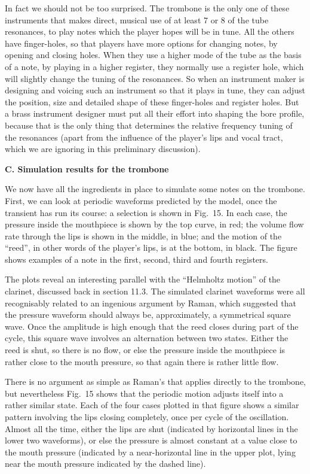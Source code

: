   In fact we should not be too surprised. The trombone is the only one of these 
  instruments that makes direct, musical use of at least 7 or 8 of the tube 
  resonances, to play notes which the player hopes will be in tune. All the 
  others have finger-holes, so that players have more options for changing 
  notes, by opening and closing holes. When they use a higher mode of the tube 
  as the basis of a note, by playing in a higher register, they normally use a 
  register hole, which will slightly change the tuning of the resonances. So 
  when an instrument maker is designing and voicing such an instrument so that 
  it plays in tune, they can adjust the position, size and detailed shape of 
  these finger-holes and register holes. But a brass instrument designer must 
  put all their effort into shaping the bore profile, because that is the only 
  thing that determines the relative frequency tuning of the resonances (apart 
  from the influence of the player's lips and vocal tract, which we are 
  ignoring in this preliminary discussion). 

  \textbf{C. Simulation results for the trombone} 

  We now have all the ingredients in place to simulate some notes on the 
  trombone. First, we can look at periodic waveforms predicted by the model, 
  once the transient has run its course: a selection is shown in Fig.\ 15. In 
  each case, the pressure inside the mouthpiece is shown by the top curve, in 
  red; the volume flow rate through the lips is shown in the middle, in blue; 
  and the motion of the “reed”, in other words of the player’s lips, is at the 
  bottom, in black. The figure shows examples of a note in the first, second, 
  third and fourth registers. 

  The plots reveal an interesting parallel with the ``Helmholtz motion'' of the 
  clarinet, discussed back in section 11.3. The simulated clarinet waveforms 
  were all recognisably related to an ingenious argument by Raman, which 
  suggested that the pressure waveform should always be, approximately, a 
  symmetrical square wave. Once the amplitude is high enough that the reed 
  closes during part of the cycle, this square wave involves an alternation 
  between two states. Either the reed is shut, so there is no flow, or else the 
  pressure inside the mouthpiece is rather close to the mouth pressure, so that 
  again there is rather little flow. 

  There is no argument as simple as Raman’s that applies directly to the 
  trombone, but nevertheless Fig.\ 15 shows that the periodic motion adjusts 
  itself into a rather similar state. Each of the four cases plotted in that 
  figure shows a similar pattern involving the lips closing completely, once 
  per cycle of the oscillation. Almost all the time, either the lips are shut 
  (indicated by horizontal lines in the lower two waveforms), or else the 
  pressure is almost constant at a value close to the mouth pressure (indicated 
  by a near-horizontal line in the upper plot, lying near the mouth pressure 
  indicated by the dashed line). 

